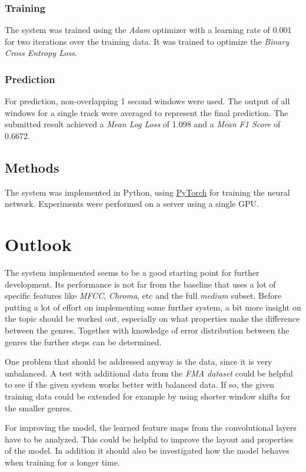 \documentclass[11pt, twocolumn]{article}
\begin{document}
\subsubsection{Training}
The system was trained using the \textit{Adam} optimizer with a learning rate of 0.001 for two iterations over the training data. It was trained to optimize the \textit{Binary Cross Entropy Loss}.

\subsubsection{Prediction}
For prediction, non-overlapping 1 second windows were used. The output of all windows for a single track were averaged to represent the final prediction. The submitted result achieved a \textit{Mean Log Loss} of 1.098 and a \textit{Mean F1 Score} of 0.6672.

\subsection{Methods}
The system was implemented in Python, using \href{http://pytorch.org/}{PyTorch} for training the neural network. Experiments were performed on a server using a single GPU. 

\section{Outlook}
The system implemented seems to be a good starting point for further development. Its performance is not far from the baseline that uses a lot of specific features like \textit{MFCC}, \textit{Chroma}, etc and the full \textit{medium} subset. Before putting a lot of effort on implementing some further system, a bit more insight on the topic should be worked out, especially on what properties make the difference between the genres. Together with knowledge of error distribution between the genres the further steps can be determined. 

One problem that should be addressed anyway is the data, since it is very unbalanced. A test with additional data from the \textit{FMA dataset} could be helpful to see if the given system works better with balanced data. If so, the given training data could be extended for example by using shorter window shifts for the smaller genres.

For improving the model, the learned feature maps from the convolutional layers have to be analyzed. This could be helpful to improve the layout and properties of the model. In addition it should also be investigated how the model behaves when training for a longer time.
\end{document}
